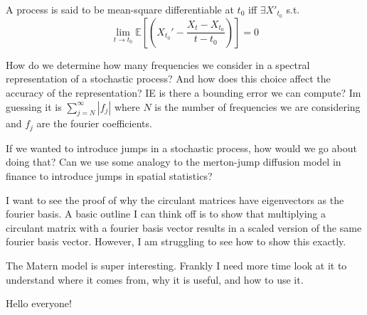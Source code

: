 \documentclass[answers,12pt,addpoints]{exam}
\begin{document}
\begin{questions}
A process is said to be mean-square differentiable at $t_0$ iff $\exists X'_{t_0}$ s.t. $$\lim_{t \to t_0} \mathbb{E} \left[\left( X_{t_0}' - \frac{X_t - X_{t_0}}{t - t_0}\right) \right] = 0$$

\question How do we determine how many frequencies we consider in a spectral representation of a stochastic process? And how does this choice affect the accuracy of the representation? IE is there a bounding error we can compute? Im guessing it is $\sum_{j = N}^{\infty} |f_j|$ where $N$ is the number of frequencies we are considering and $f_j$ are the fourier coefficients.

\question If we wanted to introduce jumps in a stochastic process, how would we go about doing that? Can we use some analogy to the merton-jump diffusion model in finance to introduce jumps in spatial statistics?

\question I want to see the proof of why the circulant matrices have eigenvectors as the fourier basis. A basic outline I can think off is to show that multiplying a circulant matrix with a fourier basis vector results in a scaled version of the same fourier basis vector. However, I am struggling to see how to show this exactly.

\question The Matern model is super interesting. Frankly I need more time look at it to understand where it comes from, why it is useful, and how to use it. 

Hello everyone!

\end{questions}
\end{document}
